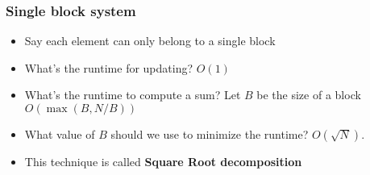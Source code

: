 \documentclass[t,handout]{beamer}
\begin{document}
\begin{frame}

    \frametitle{Single block system}
    
    \begin{figure}
        \centering

    \end{figure}
    
    \begin{itemize}
        \item Say each element can only belong to a single block
        
        \pause
        
        \item What's the runtime for updating? \pause $O(1)$
        
        \pause
        
        \item What's the runtime to compute a sum? Let $B$ be the size of a block \pause $O(\max(B, N / B))$
        
        \pause
        
        \item What value of $B$ should we use to minimize the runtime? \pause $O(\sqrt{N})$.
        
        \pause
        
        \item This technique is called \textbf{Square Root decomposition}
    \end{itemize}
\end{frame}
\end{document}

